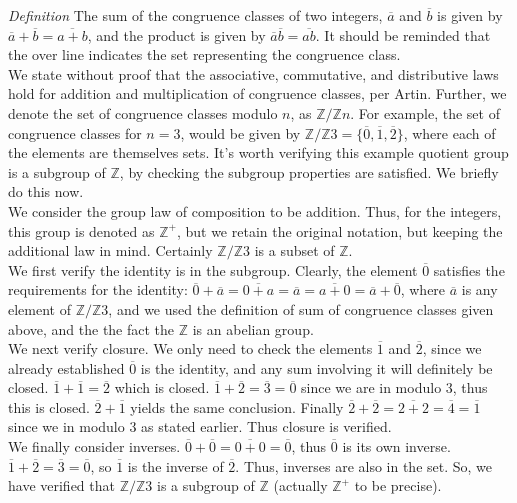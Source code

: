 \textit{Definition} The sum of the congruence classes of two integers, $\overline {a}$ and $\overline{b}$ is given by $\overline{a}+\overline{b}=\overline{a+b}$, and the product is given by $\overline{a}\overline{b}=\overline{ab}$.  It should be reminded that the over line indicates the set representing the congruence class.\\

We state without proof that the associative, commutative, and distributive laws hold for addition and multiplication of congruence classes, per Artin.  Further, we denote the set of congruence classes modulo $n$, as $\mathbb{Z}/\mathbb{Z}n$.  For example, the set of congruence classes for $n=3$, would be given by $\mathbb{Z}/\mathbb{Z}3=\{\overline{0}, \overline{1}, \overline{2} \}$, where each of the elements are themselves sets.  It's worth verifying this example quotient group is a subgroup of $\mathbb{Z}$, by checking the subgroup properties are satisfied.  We briefly do this now.\\

We consider the group law of composition to be addition. Thus, for the integers, this group is denoted as $\mathbb{Z}^{+}$, but we retain the original notation, but keeping the additional law in mind.  Certainly $\mathbb{Z}/\mathbb{Z}3$ is a subset of $\mathbb{Z}$.\\

We first verify the identity is in the subgroup.  Clearly, the element $\overline{0}$ satisfies the requirements for the identity:  $\overline{0}+\overline{a}=\overline{0+a}=\overline{a}=\overline{a+0}=\overline{a}+\overline{0}$, where $\overline{a}$ is any element of $\mathbb{Z}/\mathbb{Z}3$, and we used the definition of sum of congruence classes given above, and the the fact the $\mathbb{Z}$ is an abelian group.\\

We next verify closure.  We only need to check the elements $\overline{1}$ and $\overline{2}$, since we already established $\overline{0}$ is the identity, and any sum involving it will definitely be closed.  $\overline{1}+\overline{1}=\overline{2}$ which is closed.  $\overline{1}+\overline{2}=\overline{3}=\overline{0}$ since we are in modulo $3$, thus this is closed.  $\overline{2}+\overline{1}$ yields the same conclusion.  Finally $\overline{2}+\overline{2}=\overline{2+2}=\overline{4}=\overline{1}$ since we in modulo $3$ as stated earlier.  Thus closure is verified.\\

We finally consider inverses.  $\overline{0}+\overline{0}=\overline{0+0}=\overline{0}$, thus $\overline{0}$ is its own inverse.  $\overline{1}+\overline{2}=\overline{3}=\overline{0}$, so $\overline{1}$ is the inverse of $\overline{2}$.  Thus, inverses are also in the set.  So, we have verified that $\mathbb{Z}/\mathbb{Z}3$ is a subgroup of $\mathbb{Z}$ (actually $\mathbb{Z}^{+}$ to be precise).\\


